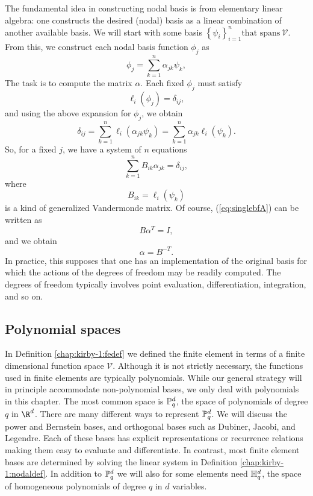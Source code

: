 The fundamental idea in constructing nodal basis is from elementary
linear algebra: one constructs the desired (nodal) basis as a linear
combination of another available basis.  We will start with some
basis \( \left\{ \psi_i \right\}_{i=1}^{n} \mbox{that spans} \  \mathcal{V}  \).  From
this, we construct each nodal basis function $\phi_j$ as
\begin{equation}
 \phi_j = \sum_{k=1}^n \alpha_{jk} \psi_k,
\end{equation}
The task is to compute the matrix \( \alpha \).  Each fixed \( \phi_j \) must
satisfy
\begin{equation}
\ell_i( \phi_j ) = \delta_{ij},
\end{equation}
and using the above expansion for \( \phi_j \), we obtain
\begin{equation}
\delta_{ij} = \sum_{k=1}^n \ell_i( \alpha_{jk} \psi_{k} ) = \sum_{k=1}^n \alpha_{jk} \ell_i (\psi_k).
\end{equation}
So, for a fixed \( j \), we have a system of \( n \) equations
\begin{equation}
\label{eq:singlebfA}
\sum_{k=1}^n B_{ik} \alpha_{jk} = \delta_{ij},
\end{equation}
where
\begin{equation}
B_{ik} = \ell_i(\psi_k)
\end{equation}
is a kind of generalized Vandermonde matrix.   Of course, (\ref{eq:singlebfA}) can be 
written as
\begin{equation}
B \alpha^T = I,
\end{equation}
and we obtain 
\begin{equation}
\alpha = B^{-T}.
\end{equation}
In practice, this supposes that one has an implementation of
the original basis for which the actions of the degrees of freedom  may be readily computed.
The degrees of freedom typically involves point evaluation, differentiation, integration, and so on. 


\subsection{Polynomial spaces}
In Definition \ref{chap:kirby-1:fedef} we defined the finite element in terms
of a finite dimensional function space $\mathcal{V}$. Although it is not strictly
necessary,
the functions used in finite elements are typically polynomials.
While our general strategy will in principle accommodate non-polynomial bases, we
only deal with polynomials in this chapter.
The most common space is
$\P_q^d$, the space of polynomials of degree $q$ in $\R^d$. There
are many different ways to represent $\P^d_q$. We will discuss the power
and Bernstein bases, and orthogonal bases such as Dubiner, Jacobi, and Legendre.  Each of these bases
has explicit representations or recurrence relations making them easy to 
evaluate and differentiate. In contrast,  
most finite element bases are determined by solving 
the linear system in Definition \ref{chap:kirby-1:nodaldef}.
In addition to $\P^d_q$ we will also for some
elements need $\H^d_q$, the space of homogeneous polynomials of degree
\( q \) in \( d \) variables.

